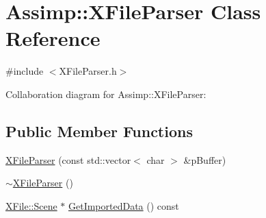 \hypertarget{class_assimp_1_1_x_file_parser}{\section{Assimp\+:\+:X\+File\+Parser Class Reference}
\label{class_assimp_1_1_x_file_parser}
}


{\ttfamily \#include $<$X\+File\+Parser.\+h$>$}



Collaboration diagram for Assimp\+:\+:X\+File\+Parser\+:
\subsection*{Public Member Functions}
\begin{DoxyCompactItemize}
\item 
\hyperlink{class_assimp_1_1_x_file_parser_a03a765a3d539d6e6b0a1bc809286c7fd}{X\+File\+Parser} (const std\+::vector$<$ char $>$ \&p\+Buffer)
\item 
\hyperlink{class_assimp_1_1_x_file_parser_a0a07145253a79ee7dfaf866b1dba4e06}{$\sim$\+X\+File\+Parser} ()
\item 
\hyperlink{struct_assimp_1_1_x_file_1_1_scene}{X\+File\+::\+Scene} $\ast$ \hyperlink{class_assimp_1_1_x_file_parser_acba18a8080cd8a2f10d42025be5b18bf}{Get\+Imported\+Data} () const 
\end{DoxyCompactItemize}
